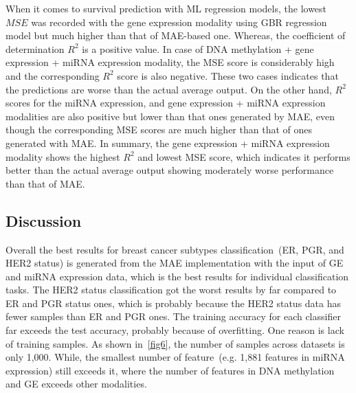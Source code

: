 \hspace*{3.5mm} When it comes to survival prediction with ML regression models, the lowest $MSE$ was recorded with the gene expression modality using GBR regression model but much higher than that of MAE-based one. Whereas, the coefficient of determination $R^2$ is a positive value. In case of DNA methylation + gene expression + miRNA expression modality, the MSE score is considerably high and the corresponding $R^2$ score is also negative. These two cases indicates that the predictions are worse than the actual average output. On the other hand, $R^2$ scores for the miRNA expression, and gene expression + miRNA expression modalities are also positive but lower than that ones generated by MAE, even though the corresponding MSE scores are much higher than that of ones generated with MAE. In summary, the gene expression + miRNA expression modality shows the highest $R^2$  and lowest MSE score, which indicates it performs better than the actual average output showing moderately worse performance than that of MAE. 
\fi 

\subsection{Discussion}\label{chapter_4:discussion}
Overall the best results for breast cancer subtypes classification~(ER, PGR, and HER2 status) is generated from the MAE implementation with the input of GE and miRNA expression data, which is the best results for individual classification tasks. The HER2 status classification got the worst results by far compared to ER and PGR status ones, which is probably because the HER2 status data has fewer samples than ER and PGR ones. The training accuracy for each classifier far exceeds the test accuracy, probably because of overfitting. One reason is lack of training samples. As shown in~\cref{fig6}, the number of samples across datasets is only 1,000. While, the smallest number of feature~(e.g. 1,881 features in miRNA expression) still exceeds it, where the number of features in DNA methylation and GE exceeds other modalities. 

